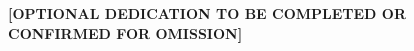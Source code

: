 \begin{dedication}
	\textbf{[OPTIONAL DEDICATION TO BE COMPLETED OR CONFIRMED FOR OMISSION]}
\end{dedication}
